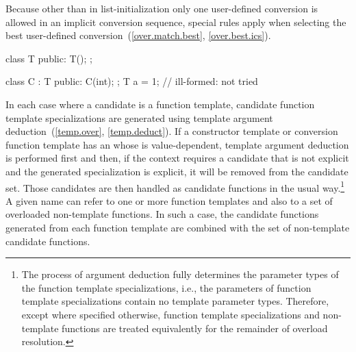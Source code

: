 \pnum
Because other than in list-initialization only one user-defined conversion
is allowed
in an
implicit conversion sequence, special rules apply when selecting
the best user-defined conversion~(\ref{over.match.best},
\ref{over.best.ics}).
\begin{example}
\begin{codeblock}
class T {
public:
  T();
};

class C : T {
public:
  C(int);
};
T a = 1;            // ill-formed:  not tried
\end{codeblock}
\end{example}

\pnum
In each case where a candidate is a function template, candidate
function template specializations
are generated using template argument deduction~(\ref{temp.over},
\ref{temp.deduct}).
If a constructor template or conversion function template
has an 
whose  is value-dependent,
template argument deduction is performed first and then,
if the context requires a candidate that
is not explicit and the generated specialization is explicit,
it will be removed from the candidate set.
Those candidates are then handled as candidate
functions in the usual way.\footnote{The process of argument deduction fully
determines the parameter types of
the
function template specializations,
i.e., the parameters of
function template specializations
contain
no template parameter types.
Therefore, except where specified otherwise,
function template specializations
and non-template functions are treated equivalently
for the remainder of overload resolution.}
A given name can refer to one or more function templates and also
to a set of overloaded non-template functions.
In such a case, the
candidate functions generated from each function template are combined
with the set of non-template candidate functions.

